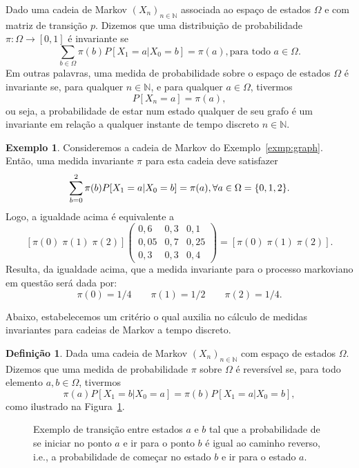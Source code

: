 \documentclass[twoside,openright,titlepage,numbers=noenddot,headinclude,  lineheaders footinclude=true,cleardoublepage=empty,
                                BCOR=5mm,paper=a4,fontsize=12pt ]{scrbook}
\theoremstyle{definition}
\newtheorem{definicao}{Definição}[chapter]
\newtheorem{exmp}{Exemplo}[section]
\begin{document}
Dado  uma cadeia de Markov $(X_n)_{n \in \mathbb{N}}$ 
associada ao espaço de estados $\Omega$ e com matriz de transição $p$. Dizemos que uma distribuição de probabilidade
$\pi: \Omega \rightarrow [0,1]$ é invariante se
\[
\sum_{b \in \Omega} \pi(b) P[X_1 = a| X_0 = b] = \pi(a), \text{para todo } a \in \Omega.
\]
Em outras palavras, uma medida de probabilidade sobre o espaço de estados $\Omega$ é invariante
se, para qualquer $n \in \mathbb{N}$, e para qualquer $a \in \Omega$, tivermos
\[
P[X_n = a] = \pi(a),
\]
ou seja, a probabilidade de estar num estado qualquer de seu grafo é um invariante em relação
a qualquer instante de tempo discreto $n \in \mathbb{N}$.
\begin{exmp}
Consideremos a cadeia de Markov do Exemplo~\ref{exmp:graph}. Então, uma medida invariante $\pi$ para esta 
cadeia deve satisfazer
\[
\sum_{b =0}^2 \pi(b) P[X_1 = a| X_0 = b] = \pi(a), \forall a \in \Omega = \{0, 1, 2\}. \\
\]
Logo, a igualdade acima é equivalente a
\[
[\pi(0) \; \pi(1) \; \pi(2)] 
\begin{pmatrix}
0,6 &  0,3 & 0,1 \\ 
0,05 &  0,7 & 0,25 \\
0,3 &  0,3 & 0,4
\end{pmatrix}
= [\pi(0) \; \pi(1) \; \pi(2) ].
\]
Resulta, da igualdade acima, que a medida invariante para o processo markoviano
em questão será dada por: 
\[
\pi(0) = 1/4 \qquad \pi(1) = 1/2 \qquad \pi(2) = 1/4.
\]
\end{exmp}
Abaixo, estabelecemos um critério o qual auxilia no cálculo de medidas invariantes
para cadeias de Markov a tempo discreto.
\begin{definicao}
Dada uma cadeia de Markov $(X_n)_{n \in \mathbb{N}}$ com espaço de estados $\Omega$. 
Dizemos que uma medida de probabilidade $\pi$ sobre $\Omega$ é reversível se,
para todo elemento $a, b \in \Omega$, tivermos
\[
\pi(a) P[X_1 = b| X_0 = a] = \pi(b) P[X_1 = a| X_0 = b],
\]
como ilustrado na Figura~\ref{fig:rev}.
\begin{figure}[h]
\centering
{}
\caption{Exemplo de transição entre estados $a$ e $b$ tal que a probabilidade
de se iniciar no ponto $a$ e ir para o ponto $b$ é igual ao caminho reverso, i.e.,
a probabilidade de começar no estado $b$ e ir para o estado $a$.}
\label{fig:rev}
\end{figure}
\end{definicao}
\end{document}
